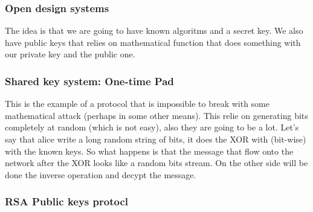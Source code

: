 \documentclass{article}
\begin{document}
      \subsubsection{Open design systems}
        The idea is that we are going to have known algoritms and a secret key. We also have
        public keys that relies on mathematical function that does something with our private
        key and the public one.
      \subsubsection{Shared key system: One-time Pad}
        This is the example of a protocol that is impossible to break with some mathematical
        attack (perhaps in some other means). This relie on generating bits completely at random
        (which is not easy), also they are going to be a lot. Let's say that alice write 
        a long random string of bits, it does the XOR with (bit-wise) with the known keys. 
        So what happens is that the message that flow onto the network after the XOR looks
        like a random bits stream. On the other side will be done the inverse operation and
        decypt the message.
      \subsubsection{RSA Public keys protocl}
\end{document}

